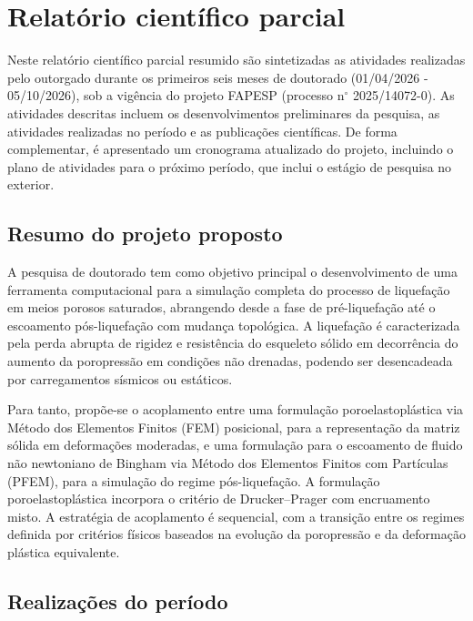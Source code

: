 \chapter{Relatório científico parcial}

Neste relatório científico parcial resumido são sintetizadas as atividades realizadas pelo outorgado durante os primeiros seis meses de doutorado (01/04/2026 - 05/10/2026), sob a vigência do projeto FAPESP (processo n$^{\circ}$ 2025/14072-0). As atividades descritas incluem os desenvolvimentos preliminares da pesquisa, as atividades realizadas no período e as publicações científicas. De forma complementar, é apresentado um cronograma atualizado do projeto, incluindo o plano de atividades para o próximo período, que inclui o estágio de pesquisa no exterior.

\section{Resumo do projeto proposto}

A pesquisa de doutorado tem como objetivo principal o desenvolvimento de uma ferramenta computacional para a simulação completa do processo de liquefação em meios porosos saturados, abrangendo desde a fase de pré-liquefação até o escoamento pós-liquefação com mudança topológica. A liquefação é caracterizada pela perda abrupta de rigidez e resistência do esqueleto sólido em decorrência do aumento da poropressão em condições não drenadas, podendo ser desencadeada por carregamentos sísmicos ou estáticos.

Para tanto, propõe-se o acoplamento entre uma formulação poroelastoplástica via Método dos Elementos Finitos (FEM) posicional, para a representação da matriz sólida em deformações moderadas, e uma formulação para o escoamento de fluido não newtoniano de Bingham via Método dos Elementos Finitos com Partículas (PFEM), para a simulação do regime pós-liquefação. A formulação poroelastoplástica incorpora o critério de Drucker--Prager com encruamento misto. A estratégia de acoplamento é sequencial, com a transição entre os regimes definida por critérios físicos baseados na evolução da poropressão e da deformação plástica equivalente.

\section{Realizações do período}

